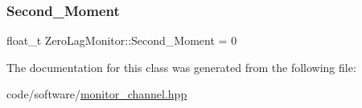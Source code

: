 \subsubsection{\texorpdfstring{Second\+\_\+\+Moment}{Second\_Moment}}
{\footnotesize\ttfamily float\+\_\+t Zero\+Lag\+Monitor\+::\+Second\+\_\+\+Moment = 0}



The documentation for this class was generated from the following file\+:\begin{DoxyCompactItemize}
\item 
code/software/\hyperlink{monitor__channel_8hpp}{monitor\+\_\+channel.\+hpp}\end{DoxyCompactItemize}
